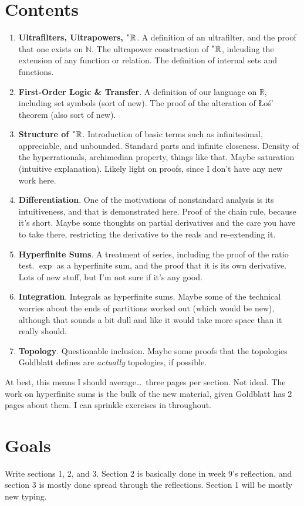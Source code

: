 \documentclass{article}
\newcommand{\reals}{\mathbb{R}}
\newcommand{\hreals}{\prescript{*}{}{\mathbb{R}}}
\newcommand{\nats}{\mathbb{N}}
\theoremstyle{definition}
\begin{document}
\section{Contents}
\begin{enumerate}
    \item \textbf{Ultrafilters, Ultrapowers, $\hreals$}. A definition of an ultrafilter, and the proof that one exists on $\nats$. The ultrapower construction of $\hreals$, inlcuding the extension of any function or relation. The definition of internal sets and functions.
    \item \textbf{First-Order Logic \& Transfer}. A definition of our language on $\reals$, including set symbols (sort of new). The proof of the alteration of \L o\'s' theorem (also sort of new).
    \item \textbf{Structure of $\hreals$}. Introduction of basic terms such as infinitesimal, appreciable, and unbounded. Standard parts and infinite closeness. Density of the hyperrationals, archimedian property, things like that. Maybe saturation (intuitive explanation). Likely light on proofs, since I don't have any new work here.
    \item \textbf{Differentiation}. One of the motivations of nonstandard analysis is its intuitiveness, and that is demonstrated here. Proof of the chain rule, because it's short. Maybe some thoughts on partial derivatives and the care you have to take there, restricting the derivative to the reals and re-extending it.
    \item \textbf{Hyperfinite Sums}. A treatment of series, including the proof of the ratio test. $\exp$ as a hyperfinite sum, and the proof that it is its own derivative. Lots of new stuff, but I'm not sure if it's any good.
    \item \textbf{Integration}. Integrals as hyperfinite sums. Maybe some of the technical worries about the ends of partitions worked out (which would be new), although that sounds a bit dull and like it would take more space than it really should. 
    \item \textbf{Topology}. Questionable inclusion. Maybe some proofs that the topologies Goldblatt defines are \textit{actually} topologies, if possible.
\end{enumerate}

At best, this means I should average\dots\ three pages per section. Not ideal. The work on hyperfinite sums is the bulk of the new material, given Goldblatt has 2 pages about them. I can sprinkle exercises in throughout.

\section{Goals}
Write sections 1, 2, and 3. Section 2 is basically done in week 9's reflection, and section 3 is mostly done spread through the reflections. Section 1 will be mostly new typing.
\end{document}

